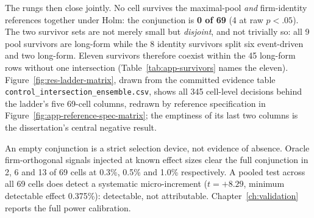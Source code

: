 The rungs then close jointly. No cell survives the maximal-pool \emph{and} firm-identity references together under Holm: the conjunction is \textbf{0 of 69} (4 at raw $p<.05$). %
The two survivor sets are not merely small but \emph{disjoint}, and not trivially so: all 9 pool survivors are long-form while the 8 identity survivors split six event-driven and two long-form. Eleven survivors therefore coexist within the 45 long-form rows without one intersection (Table~\ref{tab:app-survivors} names the eleven). %
Figure~\ref{fig:res-ladder-matrix}, drawn from the committed evidence table \texttt{control\_intersection\_ensemble.csv}, shows all 345 cell-level decisions behind the ladder's five 69-cell columns, redrawn by reference specification in Figure~\ref{fig:app-reference-spec-matrix}; the emptiness of its last two columns is the dissertation's central negative result.

An empty conjunction is a strict selection device, not evidence of absence. Oracle firm-orthogonal signals injected at known effect sizes clear the full conjunction in 2, 6 and 13 of 69 cells at 0.3\%, 0.5\% and 1.0\% respectively. A pooled test across all 69 cells does detect a systematic micro-increment ($t=+8.29$, minimum detectable effect 0.375\%): detectable, not attributable. Chapter~\ref{ch:validation} reports the full power calibration. %

